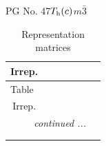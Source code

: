 \documentclass[fleqn,8pt,landscape]{jsarticle}
\begin{document}
\setcounter{MaxMatrixCols}{32}

\renewcommand{\tablename}{Table~}
\renewcommand{\figurename}{Figure~}
\begin{center}
\LARGE
PG No. 47\quad$T_{\rm h}(c)$\quad$m\bar{3}$\quad[ cubic ]
\end{center}
\renewcommand{\arraystretch}{1.2}
\begin{longtable}{ccccccc}
\caption{Representation matrices}
 \\
 \hline \hline
Irrep. &  &  &  &  &  &  \\ \hline \endfirsthead

\multicolumn{6}{l}{\tablename\ \thetable{}} \\
 \hline \hline
Irrep. &  &  &  &  &  &  \\ \hline \endhead

 \hline \hline
\multicolumn{6}{r}{\footnotesize\it continued ...} \\ \endfoot

 \hline \hline
\multicolumn{6}{r}{} \\ \endlastfoot


\end{longtable}
\end{document}

